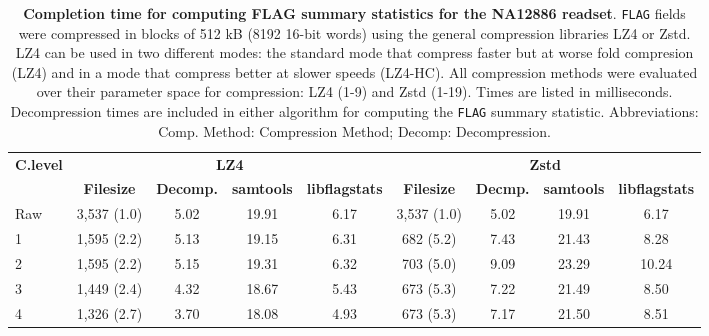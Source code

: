 \begin{table}[]
\centering
\caption{\textbf{Completion time for computing FLAG summary statistics for the NA12886 readset}. \texttt{FLAG}
fields were compressed in blocks of 512 kB (8192 16-bit words) using the general
compression libraries LZ4 or Zstd. LZ4 can be used in two different modes: the
standard mode that compress faster but at worse fold compresion (LZ4) and in a
mode that compress better at slower speeds (LZ4-HC). All compression methods
were evaluated over their parameter space for compression: LZ4 (1-9) and Zstd
(1-19). Times are listed in milliseconds. Decompression times are included in
either algorithm for computing the \texttt{FLAG} summary statistic. Abbreviations: Comp. Method:
Compression Method; Decomp: Decompression.}
\label{tab:NA12886-perf}
\begin{tabular}{|l|c|c|c|c|c|c|c|c|}
\hline
\multirow{2}{*}{\textbf{C.level}} & \multicolumn{4}{c|}{\textbf{LZ4}}                                                     & \multicolumn{4}{c|}{\textbf{Zstd}}                                                    \\ \cline{2-9} 
                                      & \textbf{Filesize}   & \textbf{Decomp.} & \textbf{samtools} & \textbf{libflagstats} & \textbf{Filesize}   & \textbf{Decmp.} & \textbf{samtools} & \textbf{libflagstats} \\ \hline
Raw                                   & 3,537 (1.0) & 5.02                & 19.91             & 6.17                  & 3,537 (1.0) & 5.02                & 19.91             & 6.17                  \\ \hline
1                                     & 1,595 (2.2) & 5.13                & 19.15             & 6.31                  & 682 (5.2)   & 7.43                & 21.43             & 8.28                  \\ \hline
2                                     & 1,595 (2.2) & 5.15                & 19.31             & 6.32                  & 703 (5.0)   & 9.09                & 23.29             & 10.24                 \\ \hline
3                                     & 1,449 (2.4) & 4.32                & 18.67             & 5.43                  & 673 (5.3)   & 7.22                & 21.49             & 8.50                  \\ \hline
4                                     & 1,326 (2.7) & 3.70                & 18.08             & 4.93                  & 673 (5.3)   & 7.17                & 21.50             & 8.51                  \\ \hline

\end{tabular}
\end{table}
